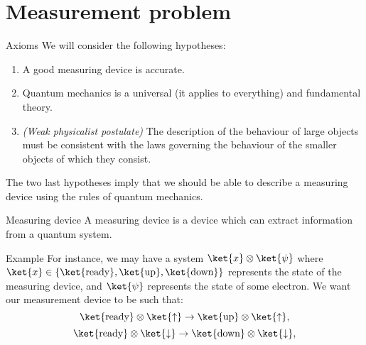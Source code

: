 \documentclass[a4paper]{article}
\begin{document}
\section{Measurement problem}

\begin{parag}{Axioms}
    We will consider the following hypotheses:
    \begin{enumerate}
        \item A good measuring device is accurate. 
        \item Quantum mechanics is a universal (it applies to everything) and fundamental theory.
        \item \textit{(Weak physicalist postulate)} The description of the behaviour of large objects must be consistent with the laws governing the behaviour of the smaller objects of which they consist.
    \end{enumerate}

    The two last hypotheses imply that we should be able to describe a measuring device using the rules of quantum mechanics. 
\end{parag}

\begin{parag}{Measuring device}
    A measuring device is a device which can extract information from a quantum system. 

    \begin{subparag}{Example}
        For instance, we may have a system $\ket{x} \otimes \ket{\psi}$ where $\ket{x} \in \left\{\ket{\text{ready}}, \ket{\text{up}}, \ket{\text{down}}\right\}$ represents the state of the measuring device, and $\ket{\psi}$ represents the state of some electron. We want our measurement device to be such that: 
        \[\ket{\text{ready}} \otimes \ket{\uparrow} \to \ket{\text{up}} \otimes \ket{\uparrow},\]
        \[\ket{\text{ready}} \otimes \ket{\downarrow} \to \ket{\text{down}} \otimes \ket{\downarrow},\]
    \end{subparag}
\end{parag}
\end{document}

